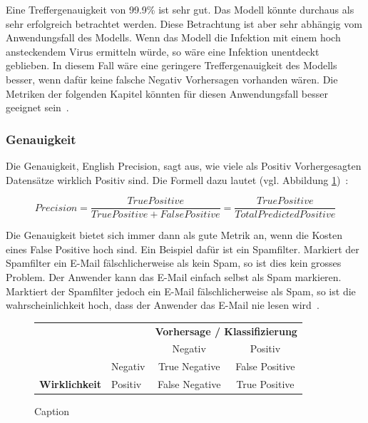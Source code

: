 Eine Treffergenauigkeit von 99.9\% ist sehr gut. Das Modell könnte durchaus als sehr erfolgreich betrachtet werden. Diese Betrachtung ist aber sehr abhängig vom Anwendungsfall des Modells. Wenn das Modell die Infektion mit einem hoch ansteckendem Virus ermitteln würde, so wäre eine Infektion unentdeckt geblieben. In diesem Fall wäre eine geringere Treffergenauigkeit des Modells besser, wenn dafür keine falsche Negativ Vorhersagen vorhanden wären. Die Metriken der folgenden Kapitel könnten für diesen Anwendungsfall besser geeignet sein~\autocite{TDSAccuracy}.

\subsubsection{Genauigkeit}

Die Genauigkeit, English Precision, sagt aus, wie viele als Positiv Vorhergesagten Datensätze wirklich Positiv sind. Die Formell dazu lautet (vgl. Abbildung \ref{cm-precision})~\autocite{TDSAccuracy}: 

$$Precision = \frac{True Positive}{True Positive + False Positive} = \frac{True Positive}{Total Predicted Positive}$$

Die Genauigkeit bietet sich immer dann als gute Metrik an, wenn die Kosten eines False Positive hoch sind. Ein Beispiel dafür ist ein Spamfilter. Markiert der Spamfilter ein E-Mail fälschlicherweise als kein Spam, so ist dies kein grosses Problem. Der Anwender kann das E-Mail einfach selbst als Spam markieren. Marktiert der Spamfilter jedoch ein E-Mail fälschlicherweise als Spam, so ist die wahrscheinlichkeit hoch, dass der Anwender das E-Mail nie lesen wird~\autocite{TDSAccuracy}.

\begin{figure}[h]
    \centering
    \def\arraystretch{1.5}
    \begin{tabular}{llcc}
        \multicolumn{2}{l}{}                                                                        & \multicolumn{2}{c}{\textbf{Vorhersage / Klassifizierung}}                                         \\ \cline{3-4} 
        \multicolumn{1}{c}{\textbf{}}                                & \multicolumn{1}{l|}{}        & \multicolumn{1}{c|}{Negativ}        & \multicolumn{1}{c|}{\cellcolor[HTML]{B5D0EE}Positiv}        \\ \cline{2-4} 
        \multicolumn{1}{l|}{}                                        & \multicolumn{1}{l|}{Negativ} & \multicolumn{1}{c|}{True Negative}  & \multicolumn{1}{c|}{\cellcolor[HTML]{B5D0EE}False Positive} \\ \cline{2-4} 
        \multicolumn{1}{l|}{\multirow{-2}{*}{\textbf{Wirklichkeit}}} & \multicolumn{1}{l|}{Positiv} & \multicolumn{1}{c|}{False Negative} & \multicolumn{1}{c|}{\cellcolor[HTML]{B5D0EE}True Positive}  \\ \cline{2-4} 
    \end{tabular}
    \caption{Caption}
    \label{cm-precision}
\end{figure}

